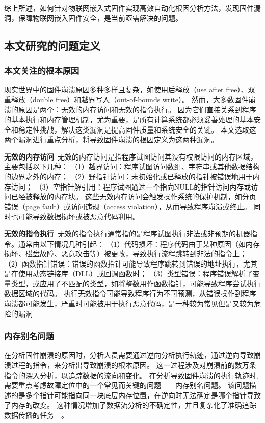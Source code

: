 综上所述，如何针对物联网嵌入式固件实现高效自动化根因分析方法，发现固件漏洞，保障物联网嵌入固件安全，是当前亟需解决的问题。

\subsection{本文研究的问题定义}             %
\subsubsection{本文关注的根本原因}          %
现实世界中的固件崩溃原因多种多样且复杂，如使用后释放（use after free）、双重释放（double free）和越界写入（out-of-bounds write）。
然而，大多数固件崩溃的原因是两个：无效的内存访问和无效的指令执行。
因为它们直接关系到程序的基本执行和内存管理机制，尤为重要，是所有计算系统都必须妥善处理的基本安全和稳定性挑战，解决这类漏洞是提高固件质量和系统安全的关键。
本文选取这两个漏洞进行重点分析，将导致固件崩溃的根因定义为这两种漏洞。

\textbf{无效的内存访问}\ 无效的内存访问是指程序试图访问其没有权限访问的内存区域，主要包括以下几种：
（1）越界访问：程序试图访问数组、字符串或其他数据结构的边界之外的内存；
（2）野指针访问：未初始化或已释放的指针被错误地用于内存访问；
（3）空指针解引用：程序试图通过一个指向NULL的指针访问内存或访问已经被释放的内存块。
这些无效内存访问会触发操作系统的保护机制，如分页错误（page fault）或访问违规（access violation），从而导致程序崩溃或终止。
同时也可能导致数据损坏或被恶意代码利用。

\textbf{无效的指令执行}\ 无效的指令执行通常指的是程序试图执行非法或非预期的机器指令。通常由以下情况几种引起：
（1）代码损坏：程序代码由于某种原因（如内存损坏、磁盘故障、恶意攻击等）被更改，导致执行流程跳转到非法的指令上；
（2）函数指针错误：错误的函数指针可能导致程序跳转到错误的地址执行，尤其是在使用动态链接库（DLL）或回调函数时；
（3）类型错误：程序错误解析了变量类型，或应用了不匹配的类型，如将整数用作函数指针，可能导致程序尝试执行数据区域的代码。
执行无效指令可能导致程序行为不可预测，从错误操作到程序崩溃都可能发生，严重时可能被用于执行恶意代码，是一种较为常见但是又较为危险的漏洞

\subsubsection{内存别名问题}                %
在分析固件崩溃的原因时，分析人员需要通过逆向分析执行轨迹，通过逆向导致崩溃过程的指令，来分析出导致崩溃的根本原因。
这一过程涉及对崩溃前的数万条指令的深入分析，以追踪数据的流向和变化。
在分析导致固件崩溃的执行轨迹时,需要重点考虑故障定位中的一个常见而关键的问题——内存别名问题。
该问题描述的是多个指针可能指向同一块底层内存位置，在逆向时无法确定是哪个指针导致了内存的改变。
这种情况增加了数据流分析的不确定性，并且复杂化了准确追踪数据传播的任务~\cite{REPT}~\cite{RETracer2016}。

